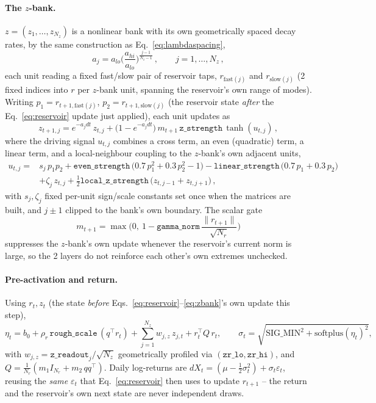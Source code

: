 \documentclass[11pt]{article}
\begin{document}
\paragraph{The $z$-bank.} $z=(z_1,\dots,z_{N_z})$ is a nonlinear bank with its
own geometrically spaced decay rates, by the same construction as
Eq.~\ref{eq:lambdaspacing},
\begin{equation}
a_j = a_{lo}\Big(\frac{a_{hi}}{a_{lo}}\Big)^{\frac{j-1}{N_z-1}}\, ,
\qquad j=1,\dots,N_z\, ,
\label{eq:aspacing}
\end{equation}
each unit reading
a fixed fast/slow pair of reservoir taps, $r_{\text{fast}(j)}$ and
$r_{\text{slow}(j)}$ (2 fixed indices into $r$ per $z$-bank unit, spanning the
reservoir's own range of modes). Writing $p_1=r_{t+1,\text{fast}(j)}$,
$p_2=r_{t+1,\text{slow}(j)}$ (the reservoir state \emph{after} the
Eq.~\ref{eq:reservoir} update just applied), each unit updates as
\begin{equation}
z_{t+1,j} = e^{-a_j dt}\, z_{t,j} + \big(1-e^{-a_j dt}\big)\, m_{t+1}\,
\texttt{z\_strength}\,\tanh(u_{t,j})\, ,
\label{eq:zbank}
\end{equation}
where the driving signal $u_{t,j}$ combines a cross term, an even (quadratic)
term, a linear term, and a local-neighbour coupling to the $z$-bank's own
adjacent units,
\begin{equation}
\begin{split}
u_{t,j} ={}& s_j\, p_1 p_2
+ \texttt{even\_strength}\,\big(0.7\,p_1^2+0.3\,p_2^2-1\big)
- \texttt{linear\_strength}\,\big(0.7\,p_1+0.3\,p_2\big) \\
& + \zeta_j\, z_{t,j}
+ \tfrac12\texttt{local\_z\_strength}\,\big(z_{t,j-1}+z_{t,j+1}\big)\, ,
\end{split}
\label{eq:zdrive}
\end{equation}
with $s_j,\zeta_j$ fixed per-unit sign/scale constants set once when the
matrices are built, and $j\pm1$ clipped to the bank's own boundary. The
scalar gate
\begin{equation}
m_{t+1} = \max\!\Big(0,\ 1-\texttt{gamma\_norm}\,\frac{\lVert r_{t+1}\rVert}
{\sqrt{N_r}}\Big)
\label{eq:gate}
\end{equation}
suppresses the $z$-bank's own update whenever the reservoir's current norm is
large, so the 2 layers do not reinforce each other's own extremes
unchecked.

\paragraph{Pre-activation and return.} Using $r_t,z_t$ (the state \emph{before}
Eqs.~\ref{eq:reservoir}--\ref{eq:zbank}'s own update this step),
\[
\eta_t = b_0 + \rho_r\,\texttt{rough\_scale}\,(q^\top r_t)
       + \sum_{j=1}^{N_z} w_{j,z}\,z_{j,t} + r_t^\top Q\, r_t,\qquad
\sigma_t=\sqrt{\text{SIG\_MIN}^2+\text{softplus}(\eta_t)^2},
\]
with $w_{j,z}=\texttt{z\_readout}_j/\sqrt{N_z}$ geometrically profiled via
$(\texttt{zr\_lo},\texttt{zr\_hi})$, and $Q=\tfrac{1}{N_r}(m_1 I_{N_r}+m_2\,qq^\top)$.
Daily log-returns are $dX_t=(\mu-\tfrac12\sigma_t^2)+\sigma_t\varepsilon_t$, reusing the
\emph{same} $\varepsilon_t$ that Eq.~\ref{eq:reservoir} then uses to update
$r_{t+1}$ -- the return and the reservoir's own next state are never
independent draws.
\end{document}
